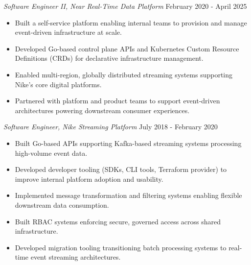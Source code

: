 \documentclass[a4paper]{article}
\begin{document}
\textit{Software Engineer II, Near Real-Time Data Platform} \hfill February 2020 - April 2025 \\
\vspace{-2mm}
\begin{itemize} \itemsep -1em
    \item Built a self-service platform enabling internal teams to provision and manage event-driven infrastructure at scale. \\
    \item Developed Go-based control plane APIs and Kubernetes Custom Resource Definitions (CRDs) for declarative infrastructure management. \\
    \item Enabled multi-region, globally distributed streaming systems supporting Nike’s core digital platforms. \\
    \item Partnered with platform and product teams to support event-driven architectures powering downstream consumer experiences. \\
\end{itemize}

\textit{Software Engineer, Nike Streaming Platform} \hfill July 2018 - February 2020 \\
\vspace{-3mm}
\begin{itemize} \itemsep -1em
    \item Built Go-based APIs supporting Kafka-based streaming systems processing high-volume event data. \\
    \item Developed developer tooling (SDKs, CLI tools, Terraform provider) to improve internal platform adoption and usability. \\
    \item Implemented message transformation and filtering systems enabling flexible downstream data consumption. \\
    \item Built RBAC systems enforcing secure, governed access across shared infrastructure. \\
    \item Developed migration tooling transitioning batch processing systems to real-time event streaming architectures. \\
\end{itemize}

\vspace{1mm}
\end{document}
